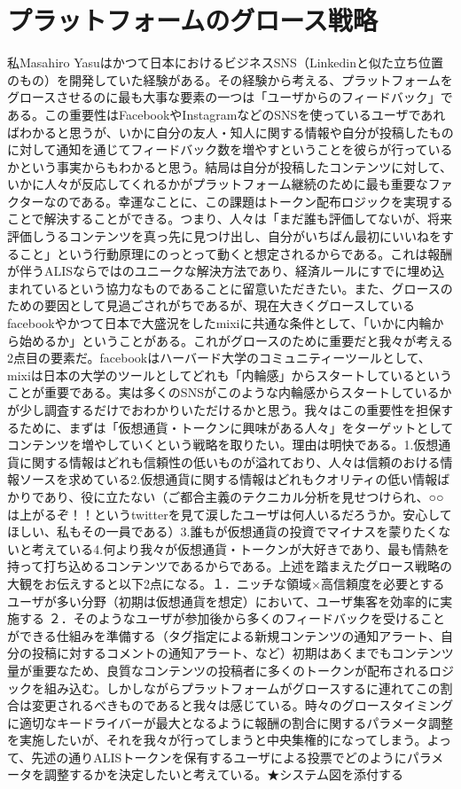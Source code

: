 \documentclass{jsarticle}
\begin{document}
\section{プラットフォームのグロース戦略}
私Masahiro Yasuはかつて日本におけるビジネスSNS（Linkedinと似た立ち位置のもの）を開発していた経験がある。その経験から考える、プラットフォームをグロースさせるのに最も大事な要素の一つは「ユーザからのフィードバック」である。この重要性はFacebookやInstagramなどのSNSを使っているユーザであればわかると思うが、いかに自分の友人・知人に関する情報や自分が投稿したものに対して通知を通じてフィードバック数を増やすということを彼らが行っているかという事実からもわかると思う。結局は自分が投稿したコンテンツに対して、いかに人々が反応してくれるかがプラットフォーム継続のために最も重要なファクターなのである。幸運なことに、この課題はトークン配布ロジックを実現することで解決することができる。つまり、人々は「まだ誰も評価してないが、将来評価しうるコンテンツを真っ先に見つけ出し、自分がいちばん最初にいいねをすること」という行動原理にのっとって動くと想定されるからである。これは報酬が伴うALISならではのユニークな解決方法であり、経済ルールにすでに埋め込まれているという協力なものであることに留意いただきたい。また、グロースのための要因として見過ごされがちであるが、現在大きくグロースしているfacebookやかつて日本で大盛況をしたmixiに共通な条件として、「いかに内輪から始めるか」ということがある。これがグロースのために重要だと我々が考える2点目の要素だ。facebookはハーバード大学のコミュニティーツールとして、mixiは日本の大学のツールとしてどれも「内輪感」からスタートしているということが重要である。実は多くのSNSがこのような内輪感からスタートしているかが少し調査するだけでおわかりいただけるかと思う。我々はこの重要性を担保するために、まずは「仮想通貨・トークンに興味がある人々」をターゲットとしてコンテンツを増やしていくという戦略を取りたい。理由は明快である。1.仮想通貨に関する情報はどれも信頼性の低いものが溢れており、人々は信頼のおける情報ソースを求めている2.仮想通貨に関する情報はどれもクオリティの低い情報ばかりであり、役に立たない（ご都合主義のテクニカル分析を見せつけられ、○○は上がるぞ！！というtwitterを見て涙したユーザは何人いるだろうか。安心してほしい、私もその一員である）3.誰もが仮想通貨の投資でマイナスを蒙りたくないと考えている4.何より我々が仮想通貨・トークンが大好きであり、最も情熱を持って打ち込めるコンテンツであるからである。上述を踏まえたグロース戦略の大観をお伝えすると以下2点になる。１．ニッチな領域×高信頼度を必要とするユーザが多い分野（初期は仮想通貨を想定）において、ユーザ集客を効率的に実施する ２．そのようなユーザが参加後から多くのフィードバックを受けることができる仕組みを準備する（タグ指定による新規コンテンツの通知アラート、自分の投稿に対するコメントの通知アラート、など）初期はあくまでもコンテンツ量が重要なため、良質なコンテンツの投稿者に多くのトークンが配布されるロジックを組み込む。しかしながらプラットフォームがグロースするに連れてこの割合は変更されるべきものであると我々は感じている。時々のグロースタイミングに適切なキードライバーが最大となるように報酬の割合に関するパラメータ調整を実施したいが、それを我々が行ってしまうと中央集権的になってしまう。よって、先述の通りALISトークンを保有するユーザによる投票でどのようにパラメータを調整するかを決定したいと考えている。★システム図を添付する
\end{document}
